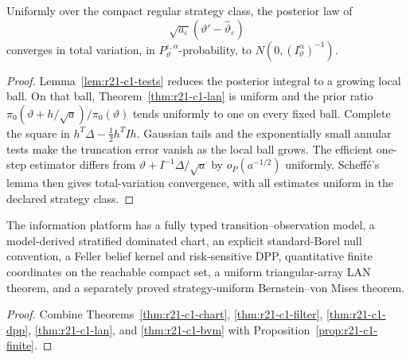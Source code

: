 \begin{theorem}
\label{thm:r21-c1-bvm}
Uniformly over the compact regular strategy class, the posterior law of
\[
 \sqrt{a_\varepsilon}
 (\vartheta'-\widehat\vartheta_\varepsilon)
\]
converges in total variation, in
$P_\vartheta^{\varepsilon,\alpha}$-probability, to
$N(0,(I_\vartheta^\alpha)^{-1})$.
\end{theorem}

\begin{proof}
Lemma~\ref{lem:r21-c1-tests} reduces the posterior integral to a growing local
ball.  On that ball, Theorem~\ref{thm:r21-c1-lan} is uniform and the prior ratio
$\pi_0(\vartheta+h/\sqrt a)/\pi_0(\vartheta)$ tends uniformly to one on every
fixed ball.  Complete the square in
$h^T\Delta-\frac12h^TIh$.  Gaussian tails and the exponentially small annular
tests make the truncation error vanish as the local ball grows.  The efficient
one-step estimator differs from
$\vartheta+I^{-1}\Delta/\sqrt a$ by
$o_P(a^{-1/2})$ uniformly.  Scheff\'e's lemma then gives total-variation
convergence, with all estimates uniform in the declared strategy class.
\end{proof}

\begin{theorem}
\label{thm:r21-c1-main}
The information platform has a fully typed transition--observation model, a
model-derived stratified dominated chart, an explicit standard-Borel null
convention, a Feller belief kernel and risk-sensitive DPP, quantitative finite
coordinates on the reachable compact set, a uniform triangular-array LAN
theorem, and a separately proved strategy-uniform Bernstein--von Mises theorem.
\end{theorem}

\begin{proof}
Combine Theorems~\ref{thm:r21-c1-chart},
\ref{thm:r21-c1-filter}, \ref{thm:r21-c1-dpp},
\ref{thm:r21-c1-lan}, and \ref{thm:r21-c1-bvm} with
Proposition~\ref{prop:r21-c1-finite}.
\end{proof}

